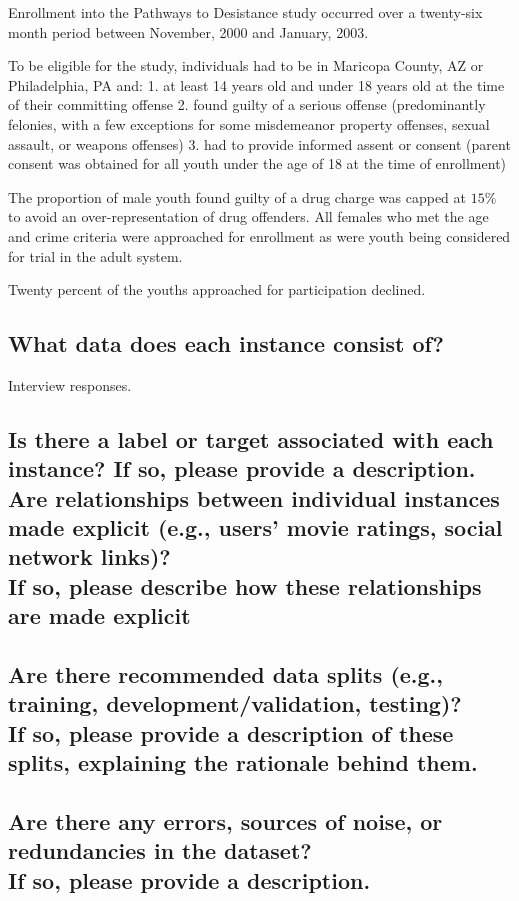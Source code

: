 \documentclass[letterpaper, 10 pt, conference]{ieeeconf}  %
\newcommand{\subtitle}[1]{{\\ \small \normalfont \color{purple} #1}}
\begin{document}
Enrollment into the Pathways to Desistance study occurred over a twenty-six month period between November, 2000 and January, 2003.

To be eligible for the study, individuals had to be in Maricopa County, AZ or Philadelphia, PA and:
1. at least 14 years old and under 18 years old at the time of their committing offense
2. found guilty of a serious offense (predominantly felonies, with a few exceptions for some misdemeanor property offenses, sexual assault, or weapons offenses)
3. had to provide informed assent or consent (parent consent was obtained for all youth under the age of 18 at the time of enrollment)


The proportion of male youth found guilty of a drug charge was capped at $15\%$ to avoid an over-representation of drug offenders. All females who met the age and crime criteria were approached for enrollment as were youth being considered for trial in the adult system.

Twenty percent of the youths approached for participation declined.

\subsection{What data does each instance consist of?}

Interview responses.

\subsection{Is there a label or target associated with each instance? If so, please provide a description. Are relationships between individual instances made explicit (e.g., users’ movie ratings, social network links)? \subtitle{If so, please describe how these relationships are made explicit}}

\lipsum[1]

\subsection{Are there recommended data splits (e.g., training, development/validation, testing)? \subtitle{If so, please provide a description of these splits, explaining the rationale behind them.}}

\lipsum[1]

\subsection{Are there any errors, sources of noise, or redundancies in the dataset? \subtitle{If so, please provide a description.}}
\end{document}
